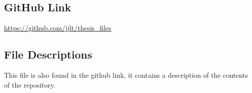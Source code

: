\documentclass[honours,12pt]{unswthesis}
\numberwithin{equation}{section}
\begin{document}
\begin{appendices}

\chapter{GitHub Link}

\url{https://github.com/jjlt/thesis_files}

\section{File Descriptions}

This file is also found in the github link, it contains a description of the contents of the repository.



\end{appendices}
\end{document}
